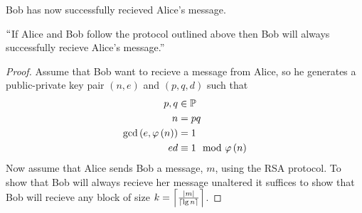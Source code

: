 \begin{definition}
\begin{itemize}
                    Bob has now successfully recieved Alice's message.
            \end{itemize}
            \begin{claim}
                $``$If Alice and Bob follow the protocol outlined above then Bob
                will always successfully recieve Alice's message.''
            \end{claim}
            \begin{proof}
                Assume that Bob want to recieve a message from Alice, so he generates a
                public-private key pair $(n, e)$ and $(p, q, d)$ such that
                \begin{align}
                    p, q & \in \set{P} \\
                    n & = pq \\
                    \gcd{e}{\eulerphi{n}} & = 1 \\
                    \label{ed requirement}
                    ed & \equiv 1 \mod \eulerphi{n}
                \end{align}
                Now assume that Alice sends Bob a message, $m$, using the RSA protocol. To show
                that Bob will always recieve her message unaltered it suffices to show that
                Bob will recieve any block of size $k = \left\lceil \frac{\left|m\right|}{\left\lceil \lg n \right\rceil} \right\rceil$.


\end{proof}
\end{definition}
